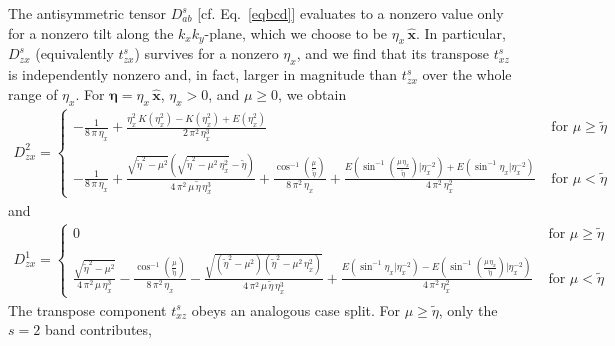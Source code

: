 \documentclass[aps,prb,onecolumn,nofootinbib,citeautoscript,10pt]{revtex4-2}
\newcommand{\bs}[1]{\boldsymbol{#1}}
\begin{document}
The antisymmetric tensor $ D_{ab}^s $ [cf. Eq.~\eqref{eqbcd}] evaluates to a nonzero value only for a nonzero tilt along the $k_x k_y$-plane, which we choose to be $\eta_x \,\bs{\hat x} $. In particular, $D^s_{zx}$ (equivalently $t^s_{zx}$) survives for a nonzero $\eta_x$, and we find that its transpose $t^s_{xz}$ is independently nonzero and, in fact, larger in magnitude than $t^s_{zx}$ over the whole range of $\eta_x$.
For $ \bs \eta = \eta_x \,\bs{\hat x} $, $\eta_x >0$, and $\mu \geq 0 $, we obtain
\begin{align}
 D^2_{zx} =\begin{cases}
-\frac{1}{8 \,\pi \, \eta_x} 
+  \frac{\eta_x^2 \,K\left(\eta_x^2\right)-K\left(\eta_x^2\right)
+ E\left(\eta_x^2\right)}{2\, \pi ^2 \,\eta_x^3}   & \text{ for }  \mu \geq\tilde \eta \\ & \\
-\frac{1}{8 \,\pi \, \eta_x} 
+ \frac{\sqrt{\tilde{\eta }^2-\mu ^2} \left(\sqrt{\tilde{\eta }^2-\mu ^2  \,\eta_x^2}-\tilde{\eta }\right)}
{4\, \pi ^2 \,\mu \,\tilde{\eta } \,\eta_x^3}
+ \frac{\cos ^{-1}\left(\frac{\mu }{\tilde{\eta }}\right)} {8 \,\pi ^2 \,\eta_x}
+
\frac{E\left(\sin ^{-1}\left(\frac{\mu \, \eta_x}{\tilde{\eta }}\right)| \eta_x^{-2}\right)
+E\left(\sin^{-1} \eta_x | \eta_x^{-2}\right)} {4\, \pi ^2 \,\eta_x^2}
 & \text{ for }  \mu < \tilde \eta  
 \end{cases}
\end{align}
and
\begin{align}
 D^1_{zx} =\begin{cases}
 0 & \text{ for }  \mu \geq\tilde \eta \\ & \\
\frac{\sqrt{\tilde{\eta }^2-\mu ^2}} {4 \,\pi ^2 \, \mu \, \eta_x^3}
-\frac{\cos ^{-1}\left(\frac{\mu }{\tilde{\eta }}\right)} {8 \,\pi ^2\, \eta_x}
-\frac{\sqrt{\left(\tilde{\eta }^2-\mu ^2\right) 
\left(\tilde{\eta }^2
-\mu ^2 \,\eta_x^2\right)}}{4 \,\pi ^2 \,\mu \, \tilde{\eta } \,\eta_x^3}
+ \frac{E\left(\sin ^{-1} \eta_x | \eta_x^{-2}\right)
-E\left(\sin ^{-1}\left(\frac{\mu \, \eta_x}{\tilde{\eta}}\right)| \eta_x^{-2}\right)}{4\, \pi ^2 \,\eta_x^2}
 & \text{ for }  \mu < \tilde \eta  
 \end{cases}
\end{align}
The transpose component $t^s_{xz}$ obeys an analogous case split. For $\mu \geq \tilde \eta$, only the $s=2$ band contributes,
\end{document}
